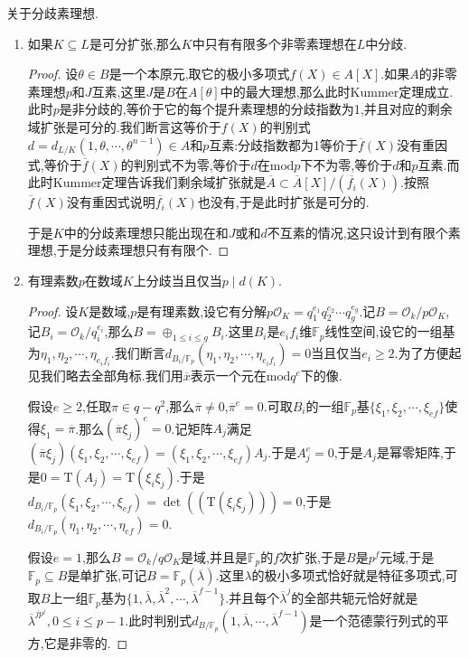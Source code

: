关于分歧素理想.
\begin{enumerate}
	\item 如果$K\subseteq L$是可分扩张,那么$K$中只有有限多个非零素理想在$L$中分歧.
	\begin{proof}
		
		设$\theta\in B$是一个本原元,取它的极小多项式$f(X)\in A[X]$.如果$A$的非零素理想$p$和$J$互素,这里$J$是$B$在$A[\theta]$中的最大理想,那么此时Kummer定理成立.此时$p$是非分歧的,等价于它的每个提升素理想的分歧指数为1,并且对应的剩余域扩张是可分的.我们断言这等价于$f(X)$的判别式$d=d_{L/K}(1,\theta,\cdots,\theta^{n-1})\in A$和$p$互素:分歧指数都为1等价于$\overline{f}(X)$没有重因式,等价于$\overline{f}(X)$的判别式不为零,等价于$d$在$\mathrm{mod}p$下不为零,等价于$d$和$p$互素.而此时Kummer定理告诉我们剩余域扩张就是$\overline{A}\subset\overline{A}[X]/(\overline{f_i}(X))$.按照$\overline{f}(X)$没有重因式说明$\overline{f_i}(X)$也没有,于是此时扩张是可分的.
		
		于是$K$中的分歧素理想只能出现在和$J$或和$d$不互素的情况,这只设计到有限个素理想,于是分歧素理想只有有限个.
	\end{proof}
    \item 有理素数$p$在数域$K$上分歧当且仅当$p\mid d(K)$.
    \begin{proof}
    	
    	设$K$是数域,$p$是有理素数,设它有分解$p\mathscr{O}_K=q_1^{e_1}q_2^{e_2}\cdots q_g^{e_g}$.记$B=\mathscr{O}_k/p\mathscr{O}_K$,记$B_i=\mathscr{O}_k/q_i^{e_i}$,那么$B=\oplus_{1\le i\le g}B_i$.这里$B_i$是$e_if_i$维$\mathbb{F}_p$线性空间,设它的一组基为$\eta_1,\eta_2,\cdots,\eta_{e_if_i}$.我们断言$d_{B_i/\mathbb{F}_p}(\eta_1,\eta_2,\cdots,\eta_{e_if_i})=0$当且仅当$e_i\ge2$.为了方便起见我们略去全部角标.我们用$\overline{x}$表示一个元在$\mathrm{mod}q^e$下的像.
    	
    	假设$e\ge2$,任取$\pi\in q-q^2$,那么$\overline{\pi}\not=0$,$\overline{\pi}^e=0$.可取$B_i$的一组$\mathbb{F}_p$基$\{\xi_1,\xi_2,\cdots,\xi_{ef}\}$使得$\xi_1=\overline{\pi}$.那么$(\overline{\pi}\xi_j)^e=0$.记矩阵$A_j$满足$(\overline{\pi}\xi_j)(\xi_1,\xi_2,\cdots,\xi_{ef})=(\xi_1,\xi_2,\cdots,\xi_{ef})A_j$.于是$A_j^e=0$,于是$A_j$是幂零矩阵,于是$0=\mathrm{T}(A_j)=\mathrm{T}(\xi_i\xi_j)$.于是$d_{B_i/\mathbb{F}_p}(\xi_1,\xi_2,\cdots,\xi_{ef})=\det((\mathrm{T}(\xi_i\xi_j)))=0$,于是$d_{B_i/\mathbb{F}_p}(\eta_1,\eta_2,\cdots,\eta_{ef})=0$.
    	
    	假设$e=1$,那么$B=\mathscr{O}_k/q\mathscr{O}_K$是域,并且是$\mathbb{F}_p$的$f$次扩张,于是$B$是$p^f$元域,于是$\mathbb{F}_p\subseteq B$是单扩张,可记$B=\mathbb{F}_p(\overline{\lambda})$.这里$\lambda$的极小多项式恰好就是特征多项式,可取$B$上一组$\mathbb{F}_p$基为$\{1,\overline{\lambda},\overline{\lambda}^2,\cdots,\overline{\lambda}^{f-1}\}$.并且每个$\overline{\lambda}^j$的全部共轭元恰好就是$\overline{\lambda}^{jp^i},0\le i\le p-1$.此时判别式$d_{B/\mathbb{F}_p}(1,\overline{\lambda},\cdots,\overline{\lambda}^{f-1})$是一个范德蒙行列式的平方,它是非零的.
    	

\end{proof}
\end{enumerate}
